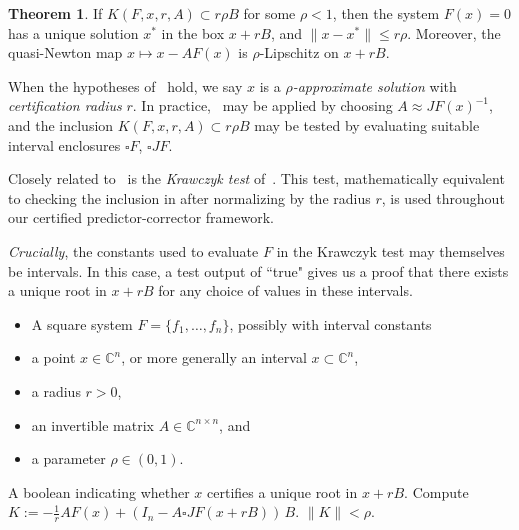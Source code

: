 \documentclass[11pt]{amsart}
\let\oldtextit\textit
\renewcommand\emph[1]{\oldtextit{\color{blue}#1}}
\theoremstyle{definition}
\newtheorem{thm}[definition]{Theorem}
\theoremstyle{remark}
\begin{document}
\begin{thm}\label{thm:Krawczyk-short}\cite[Theorem 2.1]{guillemot2024validated} 
If $K(F,x,r,A)\subset r\rho B$ for some $\rho<1$, then the system $F(x)=0$ has a unique solution $x^*$ in the box $x+rB$, and $\|x-x^*\|\le r\rho$. Moreover, the quasi-Newton map $x\mapsto x-AF(x)$ is $\rho$-Lipschitz on $x+rB$.
\end{thm}

When the hypotheses of~ hold, we say $x$ is a \emph{$\rho$-approximate solution} with \emph{certification radius} $r$. In practice,~ may be applied by choosing $A \approx JF(x)^{-1}$, and the inclusion $K(F,x,r,A)\subset r\rho B$ may be tested by evaluating suitable interval enclosures $\square F$, $\square JF$. 

Closely related to~ is the \emph{Krawczyk test} of~.
This test, mathematically equivalent to checking the inclusion in  after normalizing by the radius $r$, is used throughout our certified predictor-corrector framework.

\textit{Crucially}, the constants used to evaluate $F$ in the Krawczyk test may themselves be intervals. In this case, a test output of ``true" gives us a proof that there exists a unique root in $x+rB$ for any choice of values in these intervals.

\begin{algorithm}[ht]
\caption{KrawczykTest}\label{algo:Krawczyk-test}
\begin{algorithmic}[1]
\Require 
\begin{itemize}
    \item A square system $F=\{f_1,\dots, f_n\}$, possibly with interval constants 
    \item a point $x\in\mathbb{C}^n$, or more generally an interval $x \subset \mathbb{C}^n$,
    \item a radius $r>0$, \item an invertible matrix $A\in\mathbb{C}^{n\times n}$, and
    \item a parameter $\rho\in(0,1)$.
\end{itemize}
\Ensure A boolean indicating whether $x$ certifies a unique root in $x+rB$.
\State Compute $K := -\frac{1}{r} A F(x) + (I_n - A\square JF(x+rB))\, B$.
\State \Return $\|K\| < \rho$.
\end{algorithmic}
\end{algorithm}
\end{document}
